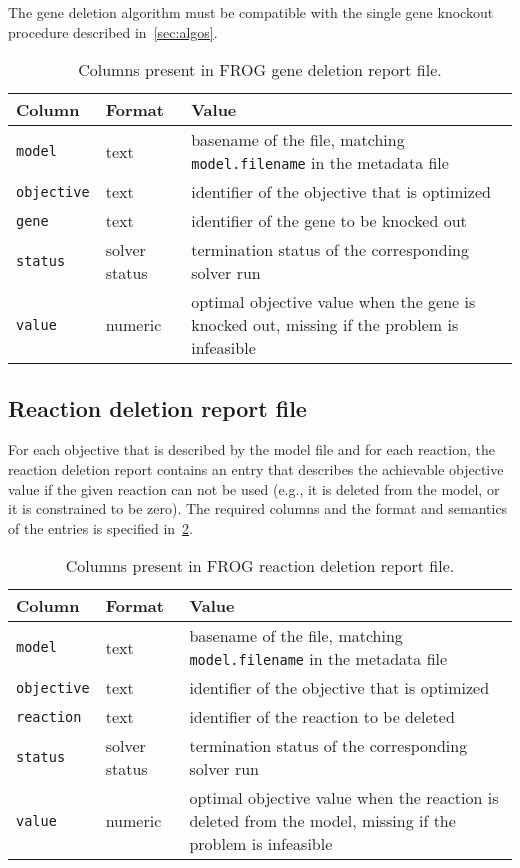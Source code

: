 The gene deletion algorithm must be compatible with the single gene knockout procedure described in~\cref{sec:algos}.

\begin{table}[p]\tablefont
\begin{tabular}{llp{30em}}
\toprule
Column & Format & Value \\
\midrule
\verb|model|
 & text
 & basename of the file, matching \verb|model.filename| in the metadata file
 \\
\verb|objective|
 & text
 & identifier of the objective that is optimized
 \\
\verb|gene|
 & text
 & identifier of the gene to be knocked out
 \\
\verb|status|
 & solver status
 & termination status of the corresponding solver run
 \\
\verb|value|
 & numeric
 & optimal objective value when the gene is knocked out, missing if the problem is infeasible
 \\
\bottomrule
\end{tabular}
\caption{Columns present in FROG gene deletion report file.}
\label{tab:genefields}
\end{table}

\subsection{Reaction deletion report file}
\label{sec:rxns}

For each objective that is described by the model file and for each reaction, the reaction deletion report contains an entry that describes the achievable objective value if the given reaction can not be used (e.g., it is deleted from the model, or it is constrained to be zero). The required columns and the format and semantics of the entries is specified in~\cref{tab:rxnsfields}.

\begin{table}[p]\tablefont
\begin{tabular}{llp{30em}}
\toprule
Column & Format & Value \\
\midrule
\verb|model|
 & text
 & basename of the file, matching \verb|model.filename| in the metadata file
 \\
\verb|objective|
 & text
 & identifier of the objective that is optimized
 \\
\verb|reaction|
 & text
 & identifier of the reaction to be deleted
 \\
\verb|status|
 & solver status
 & termination status of the corresponding solver run
 \\
\verb|value|
 & numeric
 & optimal objective value when the reaction is deleted from the model, missing if the problem is infeasible
 \\
\bottomrule
\end{tabular}
\caption{Columns present in FROG reaction deletion report file.}
\label{tab:rxnsfields}
\end{table}
